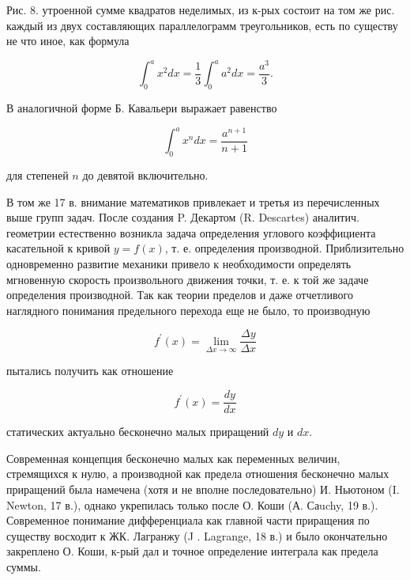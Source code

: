 \documentclass[10pt]{article}
\begin{document}
Рис. 8. утроенной сумме квадратов неделимых, из к-рых состоит на том же рис. каждый из двух составляющих параллелограмм треугольников, есть по существу не что иное, как формула



\[

\int_{0}^{a} x^{2} d x=\frac{1}{3} \int_{0}^{a} a^{2} d x=\frac{a^{3}}{3} .

\]



В аналогичной форме Б. Кавальери выражает равенство



\[

\int_{0}^{a} x^{n} d x=\frac{a^{n+1}}{n+1}

\]



для степеней $n$ до девятой включительно.



В том же 17 в. внимание математиков привлекает и третья из перечисленных выше групп задач. После создания P. Декартом (R. Descartes) аналитич. геометрии естественно возникла задача определения углового коэффициента касательной к кривой $y=f(x)$, т. е. определения производной. Приблизительно одновременно развитие механики привело к необходимости определять мгновенную скорость произвольного движения точки, т. е. к той же задаче определения производной. Так как теории пределов и даже отчетливого наглядного понимания предельного перехода еще не было, то производную



\[

f^{\prime}(x)=\lim _{\Delta x \rightarrow \infty} \frac{\Delta y}{\Delta x}

\]



пытались получить как отношение



\[

f^{\prime}(x)=\frac{d y}{d x}

\]



статических актуально бесконечно малых приращений $d y$ и $d x$.



Современная концепция бесконечно малых как переменных величин, стремящихся к нулю, а производной как предела отношения бесконечно малых приращений была намечена (хотя и не вполне последовательно) И. Ньютоном (I. Newton, 17 в.), однако укрепилась только после О. Коши (А. Саuchy, 19 в.). Современное понимание дифференциала как главной части приращения по существу восходит к ЖК. Лагранжу (J . Lagrange, 18 в.) и было окончательно закреплено О. Коши, к-рый дал и точное определение интеграла как предела суммы.
\end{document}
